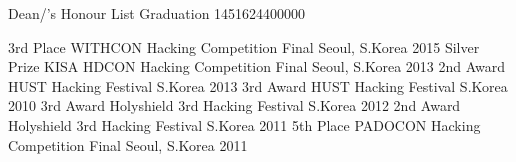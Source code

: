 
\begin{cvhonors}
  
  \cvhonor
    {Dean/'s Honour List}
    {Graduation}
    {}
    {1451624400000}
  
\end{cvhonors}

\begin{cvhonors}
  \cvhonor
    {3rd Place}
    {WITHCON Hacking Competition Final}
    {Seoul, S.Korea}
    {2015}
  \cvhonor
    {Silver Prize}
    {KISA HDCON Hacking Competition Final}
    {Seoul, S.Korea}
    {2013}
  \cvhonor
    {2nd Award}
    {HUST Hacking Festival}
    {S.Korea}
    {2013}
  \cvhonor
    {3rd Award}
    {HUST Hacking Festival}
    {S.Korea}
    {2010}
  \cvhonor
    {3rd Award}
    {Holyshield 3rd Hacking Festival}
    {S.Korea}
    {2012}
  \cvhonor
    {2nd Award}
    {Holyshield 3rd Hacking Festival}
    {S.Korea}
    {2011}
  \cvhonor
    {5th Place}
    {PADOCON Hacking Competition Final}
    {Seoul, S.Korea}
    {2011}
\end{cvhonors}

